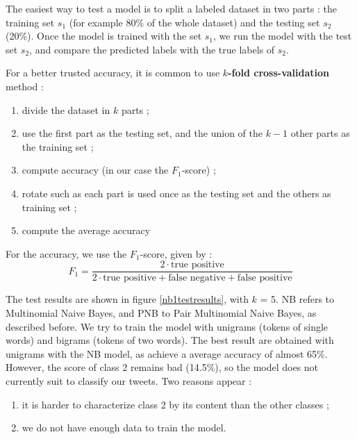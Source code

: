 \documentclass[a4paper,12pt]{report}
\begin{document}
The easiest way to test a model is to split a labeled dataset in two parts : the training set $s_1$ (for example 80\% of the whole dataset) and the testing set $s_2$ (20\%). Once the model is trained with the set $s_1$, we run the model with the test set $s_2$, and compare the predicted labels with the true labels of $s_2$.

For a better trusted accuracy, it is common to use \textbf{$k$-fold cross-validation} method :
\begin{enumerate}
\item divide the dataset in $k$ parts ;
\item use the first part as the testing set, and the union of the $k-1$ other parts as the training set ;
\item compute accuracy (in our case the $F_1$-score) ;
\item rotate such as each part is used once as the testing set and the others as training set ;
\item compute the average accuracy
\end{enumerate}

For the accuracy, we use the $F_1$-score, given by :
$$ F_1  = \frac{2\cdot\text{true positive}}{2\cdot\text{true positive}+\text{false negative}+\text{false positive}} $$

The test results are shown in figure \ref{nb1testresults}, with $k$ = 5. NB refers to Multinomial Naive Bayes, and PNB to Pair Multinomial Naive Bayes, as described before. We try to train the model with unigrams (tokens of single words) and bigrams (tokens of two words). The best result are obtained with unigrams with the NB model, as achieve a average accuracy of almost 65\%. However, the score of class 2 remains bad (14.5\%), so the model does not currently suit to classify our tweets. Two reasons appear :
\begin{enumerate}
\item it is harder to characterize class 2 by its content than the other classes ;
\item we do not have enough data to train the model.
\end{enumerate}
\end{document}
